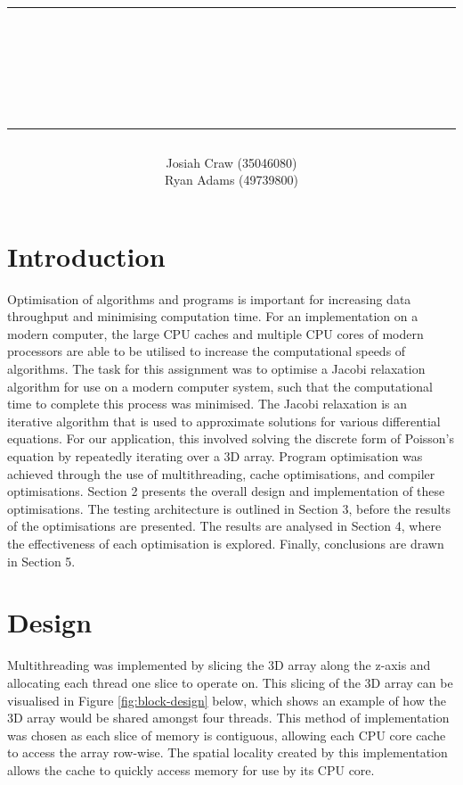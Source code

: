 \documentclass[12pt]{article}
\author{\LARGE Josiah Craw (35046080)\vspace{1cm}\\\LARGE Ryan Adams (49739800)\vspace{1cm}\\}
\title{\rule{\textwidth}{0.8pt} \\ {\huge \textbf{\reportTitle}}\\{\large \subTitle} \rule{\textwidth}{0.8pt}}
\begin{document}
\maketitle
\thispagestyle{empty}
\newpage

\setcounter{page}{1}
\section{Introduction}
Optimisation of algorithms and programs is important for increasing data throughput and
minimising computation time. For an implementation on a modern computer, the large CPU caches and multiple CPU cores
of modern processors are able to be utilised to increase the computational speeds of algorithms. The task for this
assignment was to optimise a Jacobi relaxation algorithm for use on a modern computer system, such that the
computational time to complete this process was minimised. The Jacobi relaxation is an iterative algorithm that 
is used to approximate solutions for various differential equations. For our application, this involved solving the 
discrete form of Poisson’s equation by repeatedly iterating over a 3D array. Program optimisation was achieved through 
the use of multithreading, cache optimisations, and compiler optimisations. Section 2 presents the overall design and 
implementation of these optimisations. The testing architecture is outlined in Section 3, before the results of the 
optimisations are presented. The results are analysed in Section 4, where the effectiveness of each optimisation is 
explored. Finally, conclusions are drawn in Section 5.

\section{Design}
Multithreading was implemented by slicing the 3D array along the z-axis and allocating each thread one slice to
operate on. This slicing of the 3D array can be visualised in Figure \ref{fig:block-design} below, which shows an
example of how the 3D array would be shared amongst four threads. This method of implementation was chosen as
each slice of memory is contiguous, allowing each CPU core cache to access the array row-wise. The spatial locality
created by this implementation allows the cache to quickly access memory for use by its CPU core.
\end{document}

